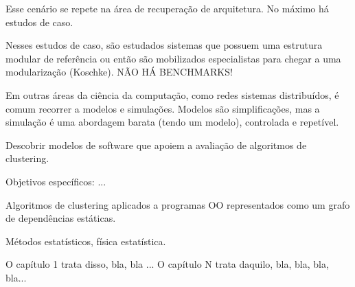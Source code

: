 Esse cenário se repete na área de recuperação de arquitetura. No máximo há estudos de caso.

Nesses estudos de caso, são estudados sistemas que possuem uma estrutura modular de referência ou então são mobilizados especialistas para chegar a uma modularização (Koschke). NÃO HÁ BENCHMARKS! %

Em outras áreas da ciência da computação, como redes sistemas distribuídos, é comum recorrer a modelos e simulações. Modelos são simplificações, mas a simulação é uma abordagem barata (tendo um modelo), controlada e repetível. %



Descobrir modelos de software que apoiem a avaliação de algoritmos de clustering.

Objetivos específicos:
 ...



Algoritmos de clustering aplicados a programas OO representados como um grafo de dependências estáticas.


Métodos estatísticos, física estatística.


O capítulo 1 trata disso, bla, bla
...
O capítulo N trata daquilo, bla, bla, bla, bla...
